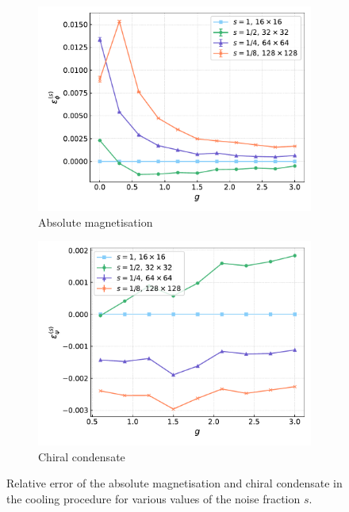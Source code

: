 \begin{figure}[htp]
    \centering
    \begin{subfigure}[b]{0.45\textwidth}
        \includegraphics[width=\textwidth]{figures/cooling/yukawa_scan/deviation.pdf}
        \caption{Absolute magnetisation}
    \end{subfigure}
    \begin{subfigure}[b]{0.45\textwidth}
        \includegraphics[width=\textwidth]{figures/cooling/yukawa_scan/deviation_cond.pdf}
        \caption{Chiral condensate}
    \end{subfigure}
    \caption[Relative error in the cooling procedure at tree level.]{Relative error of the absolute magnetisation and chiral condensate in the cooling procedure for various values of the noise fraction $s$.}
    \label{fig:cooling_deviation}
\end{figure}


\newpage



